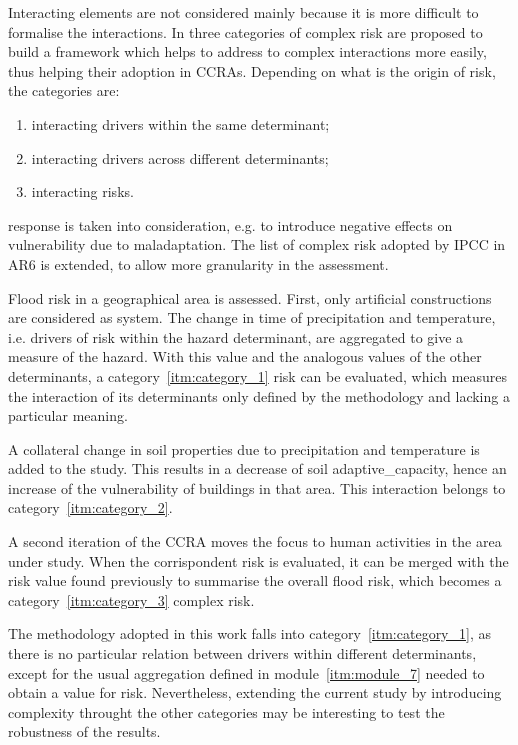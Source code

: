 Interacting elements are not considered mainly because it is more difficult to formalise the interactions. In \cite{2021SimpsonAFramework} three categories of complex \gls{risk} are proposed to build a framework which helps to address to complex interactions more easily, thus helping their adoption in \glspl{CCRA}. Depending on what is the origin of \gls{risk}, the categories are:\cite[493]{2021SimpsonAFramework}
\begin{enumerate}
  \item \label{itm:category_1} interacting \glspl{driver} within the same \gls{determinant};
  \item \label{itm:category_2} interacting \glspl{driver} across different \glspl{determinant};
  \item \label{itm:category_3} interacting \glspl{risk}.
\end{enumerate}
\Gls{response} is taken into consideration, e.g. to introduce negative effects on \gls{vulnerability} due to maladaptation. The list of complex \gls{risk} adopted by \Gls{IPCC} in \gls{AR6} is extended, to allow more granularity in the assessment.
\begin{example}
  Flood \gls{risk} in a geographical area is assessed. First, only artificial constructions are considered as system.
  The change in time of precipitation and temperature, i.e. \glspl{driver} of \gls{risk} within the \gls{hazard} \gls{determinant}, are aggregated to give a measure of the \gls{hazard}. With this value and the analogous values of the other \glspl{determinant}, a category~\ref{itm:category_1} \gls{risk} can be evaluated, which measures the interaction of its \glspl{determinant} only defined by the methodology and lacking a particular meaning.
  
  A collateral change in soil properties due to precipitation and temperature is added to the study. This results in a decrease of soil \gls{adaptive_capacity}, hence an increase of the \gls{vulnerability} of buildings in that area. This interaction belongs to category~\ref{itm:category_2}.
  
  A second iteration of the \gls{CCRA} moves the focus to human activities in the area under study. When the corrispondent \gls{risk} is evaluated, it can be merged with the \gls{risk} value found previously to summarise the overall flood \gls{risk}, which becomes a category~\ref{itm:category_3} complex \gls{risk}.
\end{example}

The methodology adopted in this work falls into category~\ref{itm:category_1}, as there is no particular relation between \glspl{driver} within different \glspl{determinant}, except for the usual aggregation defined in module~\ref{itm:module_7} needed to obtain a value for \gls{risk}.
Nevertheless, extending the current study by introducing complexity throught the other categories may be interesting to test the robustness of the results.

